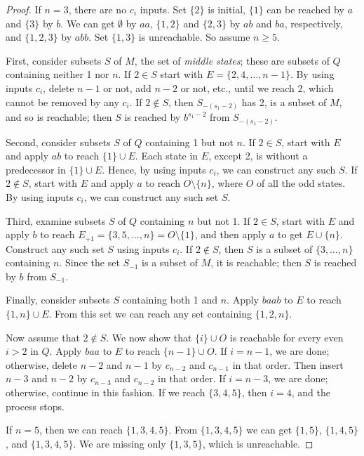 \documentclass{llncs}
\renewcommand{\ge}{\geqslant}
\newcommand{\emp}{\emptyset}
\begin{document}
\begin{proof}
If $n=3$, there are no $c_i$ inputs. Set $\{2\}$  is initial, $\{1\}$ can be reached by $a$ and $\{3\}$ by $b$.
We can get $\emp$ by  $aa$,  $\{1,2\}$ and $\{2,3\}$  by $ab$ and $ba$, respectively, and $\{1,2,3\}$  by $abb$. 
Set $\{1,3\}$ is unreachable. So assume $n\ge 5$.

First, consider subsets $S$ of $M$, the set of \emph{middle states}; these are subsets of $Q$ containing neither 1 nor $n$. If $2\in S$ start with
$E=\{2,4,\ldots,n-1\}$. 
By using inputs $c_i$, delete $n-1$ or not, add $n-2$ or not, etc., until we reach 2, which cannot be removed by any $c_i$.
If $2\not\in S$, then  $S_{-(s_1-2)}$  has 2, is a subset of $M$, and so is reachable; then $S$ is reached  by  $b^{s_1-2}$ from $S_{-(s_1-2)}$.


Second, consider subsets $S$ of $Q$ containing 1 but not $n$.
If $2\in S$, start with $E$ and apply $ab$ to reach $\{1\} \cup E$. 
Each state in $E$, except  2, is without a predecessor in $\{1\} \cup E$.
Hence, by using  inputs $c_i$, we can construct any such  $S$.
If $2\not\in S$,
start with $E$ and apply $a$ to reach $O\setminus \{n\}$, where $O$ of all the odd states.
By using inputs $c_i$, we can construct any such set $S$.



Third,  examine subsets $S$ of $Q$ containing $n$ but not 1.
If $2\in S$, start with $E$ and apply $b$ to reach $E_{+1}=\{3,5,\ldots,n\}=O\setminus\{1\}$, and then apply $a$ to get $E\cup \{n\}$.
Construct any such set $S$ using inputs $c_i$.
If $2\not\in S$, then  $S$ is a subset of $\{3,\ldots,n\}$ containing $n$. 
Since the set $S_{-1}$   is a subset of $M$, it is reachable; then $S$ is reached  by  $b$ from $S_{-1}$.


Finally, consider subsets $S$ containing both 1 and $n$.
Apply $baab$ to $E$ to reach $\{1,n\}\cup E$. From this set we can reach any set containing $\{1,2,n\}$.

Now assume that $2\not\in S$.
We now show that $\{i\} \cup O$ is reachable for every even $i>2$ in $Q$.
Apply $baa$ to $E$ to reach $\{n-1\}\cup O$.
 If $i=n-1$, we are done; otherwise, delete $n-2$ and $n-1$ by $c_{n-2}$ and $c_{n-1}$ in that order. Then insert $n-3$ and $n-2$ by $c_{n-3}$ and $c_{n-2}$ in that order.
 If $i=n-3$, we are done; otherwise,  continue in this fashion.
If we reach $\{3,4,5\}$, then $i=4$, and the process stops. 

If $n=5$, then we can reach $\{1,3,4,5\}$.
From $\{1,3,4,5\}$ we can get $\{1,5\}$, $\{1,4,5\}$, and $\{1,3,4,5\}$.
We are missing only  $\{1,3,5\}$, which is unreachable.






\end{proof}
\end{document}
